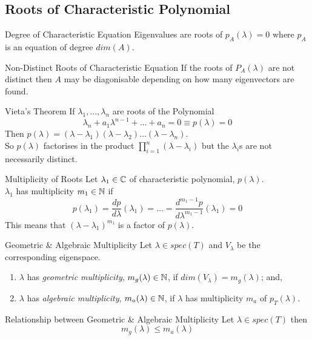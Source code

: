 \documentclass[11pt,a4paper]{article}
\begin{document}
\subsection{Roots of Characteristic Polynomial}

\subtitle{Remark 8.15 - }{Degree of Characteristic Equation}
Eigenvalues are roots of $p_A(\lambda) = 0$ where $p_A$ is an equation of degree $dim(A)$.\\

\subtitle{Remark 8.16 - }{Non-Distinct Roots of Characteristic Equation}
If the roots of $P_A(\lambda)$ are not distinct then $A$ may be diagonisable depending on how many eigenvectors are found.\\

\subtitle{Theorem 8.17 - }{Vieta's Theorem}
If $\lambda_1 , \dots , \lambda_n$ are roots of the Polynomial
$$\lambda_n + a_1\lambda^{n-1} + \dots + a_n = 0 \equiv p(\lambda) = 0$$
Then $p(\lambda) = (\lambda-\lambda_1)(\lambda - \lambda_2) \dots (\lambda - \lambda_n)$.\\
So $p(\lambda)$ factorises in the product $\prod_{i=1}^{n}(\lambda - \lambda_i)$ but the $\lambda_i$s are not necessarily distinct.\\

\subtitle{Definition 8.18 - }{Multiplicity of Roots}
Let $\lambda_1 \in \mathbb{C}$ of characteristic polynomial, $p(\lambda)$.\\
$\lambda_1$ has multiplicity $m_1 \in \mathbb{N}$ if
$$p(\lambda_1) = \frac{dp}{d\lambda}(\lambda_1) = \dots = \frac{d^{m_1 - 1}p}{d\lambda^{m_1 - 1}}(\lambda_1) = 0$$
This means that $(\lambda - \lambda_1)^{m_1}$ is a factor of $p(\lambda)$.\\

\subtitle{Definition 8.19 - }{Geometric \& Algebraic Multiplicity}
Let $\lambda \in spec(T)$ and $V_\lambda$ be the corresponding eigenspace.
\begin{enumerate}[label=\roman*)]
  \item $\lambda$ has \textit{geometric multiplicity}, $m_g(\lambda) \in \mathbb{N}$, if $dim(V_\lambda) = m_g(\lambda)$; and,
  \item $\lambda$ has \textit{algebraic multiplicity}, $m_a(\lambda) \in \mathbb{N}$, if $\lambda$ has multiplicity $m_a$ of $p_T(\lambda)$.\\
\end{enumerate}

\subtitle{Theorem 8.20 - }{Relationship between Geometric \& Algebraic Multiplicity}
Let $\lambda \in spec(T)$ then $$m_g(\lambda) \leq m_a(\lambda)$$
\end{document}

